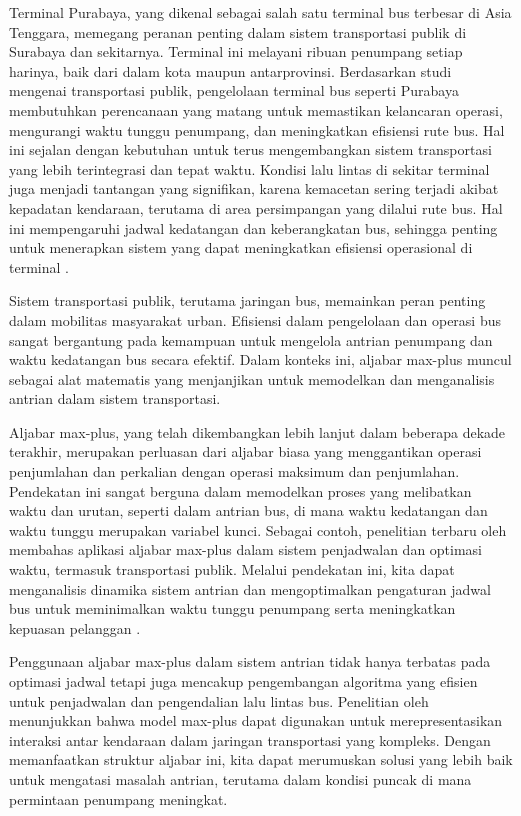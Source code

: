 \documentclass{file/TA-ITS}
\theoremstyle{definition}
\theoremstyle{definition}
\theoremstyle{plain}
\begin{document}
Terminal Purabaya, yang dikenal sebagai salah satu terminal bus terbesar di Asia Tenggara, memegang peranan penting dalam sistem transportasi publik di Surabaya dan sekitarnya. Terminal ini melayani ribuan penumpang setiap harinya, baik dari dalam kota maupun antarprovinsi. Berdasarkan studi mengenai transportasi publik, pengelolaan terminal bus seperti Purabaya membutuhkan perencanaan yang matang untuk memastikan kelancaran operasi, mengurangi waktu tunggu penumpang, dan meningkatkan efisiensi rute bus. Hal ini sejalan dengan kebutuhan untuk terus mengembangkan sistem transportasi yang lebih terintegrasi dan tepat waktu. Kondisi lalu lintas di sekitar terminal juga menjadi tantangan yang signifikan, karena kemacetan sering terjadi akibat kepadatan kendaraan, terutama di area persimpangan yang dilalui rute bus. Hal ini mempengaruhi jadwal kedatangan dan keberangkatan bus, sehingga penting untuk menerapkan sistem yang dapat meningkatkan efisiensi operasional di terminal \cite{budi2018}.

Sistem transportasi publik, terutama jaringan bus, memainkan peran penting dalam mobilitas masyarakat urban. Efisiensi dalam pengelolaan dan operasi bus sangat bergantung pada kemampuan untuk mengelola antrian penumpang dan waktu kedatangan bus secara efektif. Dalam konteks ini, aljabar max-plus muncul sebagai alat matematis yang menjanjikan untuk memodelkan dan menganalisis antrian dalam sistem transportasi.

Aljabar max-plus, yang telah dikembangkan lebih lanjut dalam beberapa dekade terakhir, merupakan perluasan dari aljabar biasa yang menggantikan operasi penjumlahan dan perkalian dengan operasi maksimum dan penjumlahan. Pendekatan ini sangat berguna dalam memodelkan proses yang melibatkan waktu dan urutan, seperti dalam antrian bus, di mana waktu kedatangan dan waktu tunggu merupakan variabel kunci. Sebagai contoh, penelitian terbaru oleh \citeauthor{butkovic2010maxplus} membahas aplikasi aljabar max-plus dalam sistem penjadwalan dan optimasi waktu, termasuk transportasi publik. Melalui pendekatan ini, kita dapat menganalisis dinamika sistem antrian dan mengoptimalkan pengaturan jadwal bus untuk meminimalkan waktu tunggu penumpang serta meningkatkan kepuasan pelanggan \cite{butkovic2010maxplus}.

Penggunaan aljabar max-plus dalam sistem antrian tidak hanya terbatas pada optimasi jadwal tetapi juga mencakup pengembangan algoritma yang efisien untuk penjadwalan dan pengendalian lalu lintas bus. Penelitian oleh \citeauthor{baccelli} menunjukkan bahwa model max-plus dapat digunakan untuk merepresentasikan interaksi antar kendaraan dalam jaringan transportasi yang kompleks. Dengan memanfaatkan struktur aljabar ini, kita dapat merumuskan solusi yang lebih baik untuk mengatasi masalah antrian, terutama dalam kondisi puncak di mana permintaan penumpang meningkat.
\end{document}
